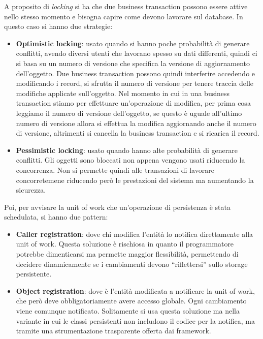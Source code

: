 A proposito di \textit{locking} si ha che due business transaction possono essere
attive nello stesso momento e bisogna capire come devono lavorare sul database.
In questo caso si hanno due strategie:
\begin{itemize}
      \item \textbf{Optimistic locking}: usato quando si hanno poche probabilità
            di generare conflitti, avendo diversi utenti che lavorano spesso su
            dati differenti, quindi ci si basa su un numero di versione che specifica
            la versione di aggiornamento dell'oggetto.
            Due business transaction possono quindi
            interferire accedendo e modificando i record, si sfrutta il numero
            di versione per tenere traccia delle modifiche applicate sull'oggetto. 
            Nel momento in cui in una business transaction stiamo per effettuare
            un'operazione di modifica, per prima cosa leggiamo il numero di versione
            dell'oggetto, se questo è uguale all'ultimo numero di versione allora
            si effettua la modifica aggiornando anche il numero di versione,
            altrimenti si cancella la business transaction e si ricarica il record.
      \item \textbf{Pessimistic locking}: usato quando hanno alte probabilità di
            generare conflitti. Gli oggetti sono bloccati non appena vengono
            usati riducendo la concorrenza. Non si permette quindi alle
            transazioni di lavorare concorretemene riducendo però le prestazioni
            del sistema ma aumentando la sicurezza.
\end{itemize}
Poi, per avvisare la unit of work che un'operazione di persistenza è stata
schedulata, si hanno due pattern:
\begin{itemize}
      \item \textbf{Caller registration}: dove chi modifica l'entità lo notifica
            direttamente alla unit of work. Questa soluzione è rischiosa in quanto
            il programmatore potrebbe dimenticarsi ma permette maggior
            flessibilità, permettendo di decidere dinamicamente se i cambiamenti
            devono “riflettersi” sullo storage persistente.
      \item \textbf{Object registration}: dove è l'entità modificata a notificare
            la unit of work, che però deve obbligatoriamente avere accesso globale.
            Ogni cambiamento viene comunque notificato. Solitamente si usa questa
            soluzione ma nella variante in cui le classi persistenti non includono
            il codice per la notifica, ma tramite una strumentazione trasparente
            offerta dai framework.
\end{itemize}
